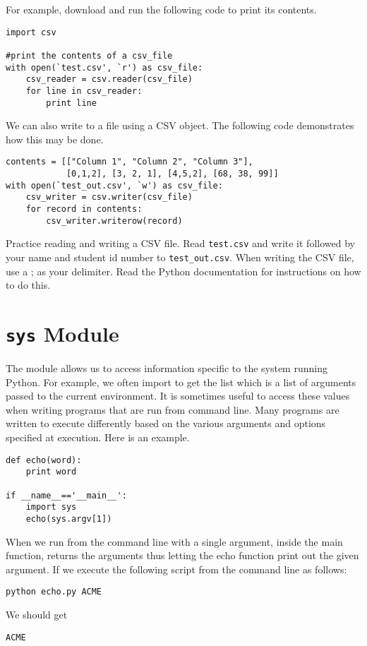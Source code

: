 For example, download  and run the following code to print its contents.
\begin{lstlisting}
import csv

#print the contents of a csv_file
with open(`test.csv', `r') as csv_file:
    csv_reader = csv.reader(csv_file)
    for line in csv_reader:
        print line
\end{lstlisting}

We can also write to a  file using a CSV  object.  The following code demonstrates how this may be done.

\begin{lstlisting}
contents = [["Column 1", "Column 2", "Column 3"],
            [0,1,2], [3, 2, 1], [4,5,2], [68, 38, 99]]
with open(`test_out.csv', `w') as csv_file:
    csv_writer = csv.writer(csv_file)
    for record in contents:
        csv_writer.writerow(record)
\end{lstlisting}

\begin{problem}
Practice reading and writing a CSV file.
Read \texttt{test.csv} and write it followed by your name and student id number to \texttt{test\_out.csv}.
When writing the CSV file, use a ; as your delimiter.
Read the Python documentation for instructions on how to do this.
\end{problem}

\section*{\texttt{sys} Module}
The  module allows us to access information specific to the system running Python.
For example, we often import  to get the list  which is a list of arguments passed to the current environment.
It is sometimes useful to access these values when writing programs that are run from command line.
Many programs are written to execute differently based on the various arguments and options specified at execution.
Here is an example.
\begin{lstlisting}[title = echo.py]
def echo(word):
	print word
	
if __name__=='__main__':
	import sys
	echo(sys.argv[1])
\end{lstlisting}
When we run from the command line with a single argument, inside the main function,  returns the arguments thus letting the echo function print out the given argument.
If we execute the following script from the command line as follows:
\begin{verbatim}
python echo.py ACME
\end{verbatim}
We should get
\begin{verbatim}
ACME
\end{verbatim}



